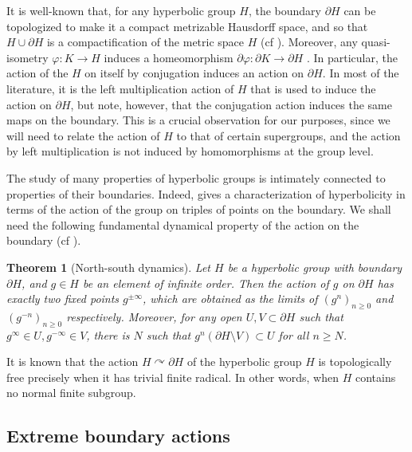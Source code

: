 \documentclass[11pt]{article}
\newtheorem{thm}{Theorem}[section]
\theoremstyle{definition}
\theoremstyle{remark}
\numberwithin{equation}{section}
\numberwithin{equation}{section}
\numberwithin{equation}{section}
\begin{document}
It is well-known that, for any hyperbolic group $H$, the boundary $\partial H$ can be topologized to make it a compact metrizable Hausdorff space, and so that \( H \cup \partial H \) is a compactification of the metric space \( H \) (cf \cite[Section H.3]{BrHa99}). Moreover, any quasi-isometry \( \varphi : K \to H \) induces a homeomorphism \( \partial \varphi : \partial K \to \partial H \) \cite[Theorem H.3.9]{BrHa99}. In particular, the action of the \( H \) on itself by conjugation induces an action on \( \partial H \). In most of the literature, it is the left multiplication action of \( H \) that is used to induce the action on \( \partial H \), but note, however, that the conjugation action induces the same maps on the boundary. This is a crucial observation for our purposes, since we will need to relate the action of \( H \) to that of certain supergroups, and the action by left multiplication is not induced by homomorphisms at the group level.

The study of many properties of hyperbolic groups is intimately connected to properties of their boundaries. Indeed, \cite{Bo98} gives a characterization of hyperbolicity in terms of the action of the group on triples of points on the boundary. We shall need the following fundamental dynamical property of the action on the boundary (cf \cite{KaBe02}).

\begin{thm}[North-south dynamics]\label{NS}
   Let \( H \) be a hyperbolic group with boundary \( \partial H \), and \( g \in H \) be an element of infinite order. Then the action of \( g \) on \( \partial H \) has exactly two fixed points \( g^{\pm\infty} \), which are obtained as the limits of \( (g^n)_{n \geq 0} \) and \( (g^{-n})_{n \geq 0} \) respectively. Moreover, for any open \( U,V \subset \partial H \) such that \( g^\infty \in U, g^{-\infty} \in V \), there is \( N \) such that \( g^n (\partial H \setminus V) \subset U \) for all \( n \geq N \).
\end{thm}

It is known that the action $H\curvearrowright\partial H$ of the hyperbolic group $H$ is topologically free precisely when it has trivial finite radical. In other words, when $H$ contains no normal finite subgroup.




\subsection{Extreme boundary actions}\label{criteria}
\end{document}
